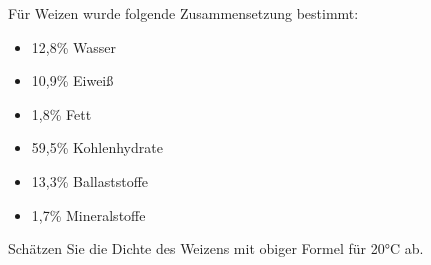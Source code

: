 \documentclass[a4paper,11pt]{article}
\newif\ifshowme
\begin{document}
\begin{enumerate}[leftmargin=6mm,font={\bfseries \sffamily \color{uniblau!75!black}},label=\alph*)]
\begin{table}[h]
\centering
\captionsetup{width=.85\linewidth}
\caption{Dichte $\rho$ in kg/m$^3$ für verschiede Lebensmittelkomponenten; Daten nach Singh \& Heldman, Introduction to Food Engineering}
\label{table1}
\end{table}


\pp

Für Weizen wurde folgende Zusammensetzung bestimmt: 

\begin{multicols}{2}

\begin{itemize}
\item 12,8\% Wasser
\item 10,9\% Eiweiß
\item 1,8\% Fett
\item 59,5\% Kohlenhydrate
\item 13,3\% Ballaststoffe
\item 1,7\% Mineralstoffe

\end{itemize}

\end{multicols}
Schätzen Sie die Dichte des Weizens mit obiger Formel für 20°C ab.

\ifshowme
\antwort{
\small
\begin{align*}
&\rho = \frac{1}{\sum \frac{m_i}{\rho_i}} = \\
& \frac{1}{\frac{0,128}{995,7399} + \frac{0,109}{1.319,532} + \frac{0,018}{917,2386} + \frac{0,595}{1.592,8908} + \frac{0,133}{1.304,1822} + \frac{0,017}{2.418,1874}} \\ \\
&= 1.401,90~\text{kg/m}^3
\end{align*}
}
\pagebreak
\else
\fi


\end{enumerate}
\end{document}
